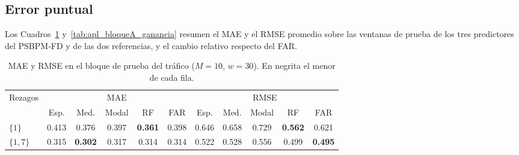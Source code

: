 \subsection{Error puntual}
\label{04_03_01_error_puntual}

Los Cuadros~\ref{tab:apl_bloqueA} y~\ref{tab:apl_bloqueA_ganancia} resumen el MAE y el RMSE promedio sobre las ventanas de prueba de los tres predictores del PSBPM-FD y de las dos referencias, y el cambio relativo respecto del FAR.

\begin{table}[H]
\centering\small
\setlength{\tabcolsep}{3.5pt}
\caption{MAE y RMSE en el bloque de prueba del tráfico ($M = 10$, $w = 30$). En negrita el menor de cada fila.}
\label{tab:apl_bloqueA}
\begin{tabular}{l ccccc ccccc}
\hline
Rezagos & \multicolumn{5}{c}{MAE} & \multicolumn{5}{c}{RMSE} \\
 & Esp. & Med. & Modal & RF & FAR & Esp. & Med. & Modal & RF & FAR \\
\hline
$\{1\}$ & 0.413 & 0.376 & 0.397 & \textbf{0.361} & 0.398 & 0.646 & 0.658 & 0.729 & \textbf{0.562} & 0.621 \\
$\{1,7\}$ & 0.315 & \textbf{0.302} & 0.317 & 0.314 & 0.314 & 0.522 & 0.528 & 0.556 & 0.499 & \textbf{0.495} \\
\hline
\end{tabular}
\end{table}

